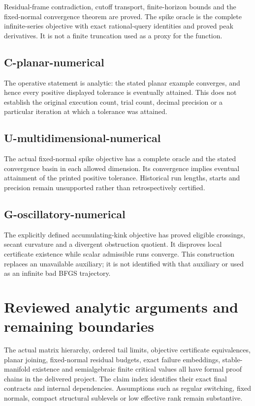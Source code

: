 Residual-frame contradiction, cutoff transport, finite-horizon bounds and the fixed-normal convergence theorem are proved. The spike oracle is the complete infinite-series objective with exact rational-query identities and proved peak derivatives. It is not a finite truncation used as a proxy for the function.

\subsection{C-planar-numerical}\label{c-planar-numerical}

The operative statement is analytic: the stated planar example converges, and hence every positive displayed tolerance is eventually attained. This does not establish the original execution count, trial count, decimal precision or a particular iteration at which a tolerance was attained.

\subsection{U-multidimensional-numerical}\label{u-multidimensional-numerical}

The actual fixed-normal spike objective has a complete oracle and the stated convergence basin in each allowed dimension. Its convergence implies eventual attainment of the printed positive tolerance. Historical run lengths, starts and precision remain unsupported rather than retrospectively certified.

\subsection{G-oscillatory-numerical}\label{g-oscillatory-numerical}

The explicitly defined accumulating-kink objective has proved eligible crossings, secant curvature and a divergent obstruction quotient. It disproves local certificate existence while scalar admissible runs converge. This construction replaces an unavailable auxiliary; it is not identified with that auxiliary or used as an infinite bad BFGS trajectory.

\section{Reviewed analytic arguments and remaining boundaries}\label{analytic-steps-that-still-require-independent-review}

The actual matrix hierarchy, ordered tail limits, objective certificate equivalences, planar joining, fixed-normal residual budgets, exact failure embeddings, stable-manifold existence and semialgebraic finite critical values all have formal proof chains in the delivered project. The claim index identifies their exact final contracts and internal dependencies. Assumptions such as regular switching, fixed normals, compact structural sublevels or low effective rank remain substantive.

